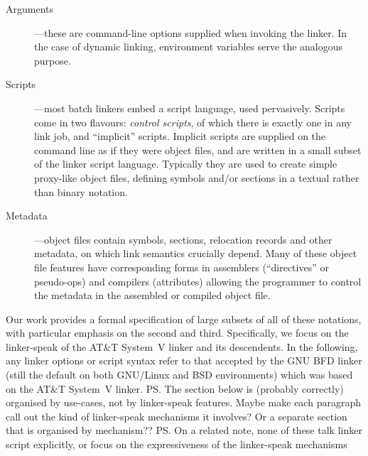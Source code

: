 \begin{description}

\item[Arguments] ---these are command-line options supplied when invoking the linker.
In the case of dynamic linking, environment variables serve the analogous purpose.

\item[Scripts] ---most batch linkers embed a script language, used pervasively.
Scripts come in two flavours: \emph{control scripts}, 
of which there is exactly one in any link job,
and ``implicit'' scripts. 
Implicit scripts are supplied on the command line as if they were object files, 
and are written in a small subset of the linker script language.
Typically they are used to create simple proxy-like object files, defining symbols
and/or sections in a textual rather than binary notation.

\item[Metadata] ---object files contain symbols, sections, relocation records
and other metadata, on which link semantics crucially depend. Many of these 
object file features have corresponding forms in assemblers (``directives'' or pseudo-ops) and compilers (attributes) allowing the programmer
to control the metadata in the assembled or compiled object file.


\end{description}

Our work provides a formal specification
of large subsets of all of these notations, with particular emphasis on
the second and third.
Specifically, we focus on the linker-speak of the AT\&T System~V linker
and its descendents. 
In the following, any linker options or script syntax
refer to that accepted by the GNU BFD linker
(still the 
default on both GNU/Linux and BSD environments)
which was based on the AT\&T System~V linker.
\ps{The section below is (probably correctly) organised by
  use-cases, not by linker-speak features.  Maybe make each paragraph
  call out the kind of linker-speak mechanisms it involves?  Or a
  separate section that is organised by mechanism??}
\ps{On a related note, none of these talk linker script explicitly, or
  focus on the expressiveness of the linker-speak mechanisms}


